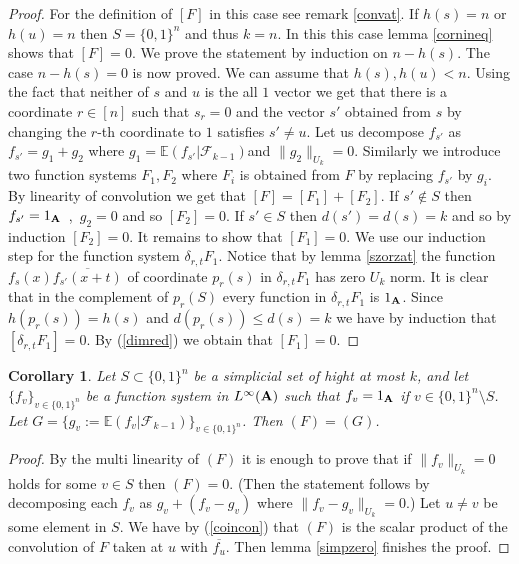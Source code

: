 \documentclass [11pt] {article}
\newtheorem{corollary}{Corollary}[section]
\def\bA{{\bf A}}
\begin{document}
\begin{proof}
For the definition of $[F]$ in this case see remark \ref{convat}. If $h(s)=n$ or $h(u)=n$ then $S=\{0,1\}^n$ and thus $k=n$. In this this case lemma \ref{cornineq} shows that $[F]=0$. We prove the statement by induction on $n-h(s)$. The case $n-h(s)=0$ is now proved. We can assume that $h(s),h(u)<n$. 
Using the fact that neither of $s$ and $u$ is the all $1$ vector we get that there is a coordinate $r\in [n]$ such that $s_r=0$ and the vector $s'$ obtained from $s$ by changing the $r$-th coordinate to $1$ satisfies $s'\neq u$. Let us decompose $f_{s'}$ as $f_{s'}=g_1+g_2$ where $g_1=\mathbb{E}(f_{s'}|\mathcal{F}_{k-1})$and $\|g_2\|_{U_k}=0$. Similarly we introduce two function systems $F_1,F_2$ where $F_i$ is obtained from $F$ by replacing $f_{s'}$ by $g_i$.
By linearity of convolution we get that $[F]=[F_1]+[F_2]$. If $s'\notin S$ then $f_{s'}=1_{\bA}$~,~$g_2=0$ and so $[F_2]=0$. If $s'\in S$ then $d(s')=d(s)=k$ and so by induction $[F_2]=0$. It remains to show that $[F_1]=0$.
We use our induction step for the function system $\delta_{r,t} F_1$. Notice that by lemma \ref{szorzat} the function $f_s(x)\overline{f_{s'}(x+t)}$ of coordinate $p_r(s)$ in $\delta_{r,t} F_1$ has zero $U_k$ norm. It is clear that in the complement of $p_r(S)$ every function in $\delta_{r,t} F_1$ is $1_{\bA}$. Since $h(p_r(s))=h(s)$ and $d(p_r(s))\leq d(s)=k$ we have by induction that $[\delta_{r,t} F_1]=0$. By (\ref{dimred}) we obtain that $[F_1]=0$.
\end{proof}

\begin{corollary}\label{simpzerocor} Let $S\subset\{0,1\}^n$ be a simplicial set of hight at most $k$, and let $\{f_v\}_{v\in\{0,1\}^n}$ be a function system in $L^\infty(\bA)$ such that $f_v=1_{\bA}$ if $v\in\{0,1\}^n\setminus S$. Let $G=\{g_v:=\mathbb{E}(f_v|\mathcal{F}_{k-1})\}_{v\in\{0,1\}^n}$. Then $(F)=(G)$. 
\end{corollary}

\begin{proof} By the multi linearity of $(F)$ it is enough to prove that if $\|f_v\|_{U_k}=0$ holds for some $v\in S$ then $(F)=0$. (Then the statement follows by decomposing each $f_v$ as $g_v+(f_v-g_v)$ where $\|f_v-g_v\|_{U_k}=0$.)
Let $u\neq v$ be some element in $S$. We have by (\ref{coincon}) that $(F)$ is the scalar product of the convolution of $F$ taken at $u$ with $\overline{f_u}$. Then lemma \ref{simpzero} finishes the proof. 
\end{proof}
\end{document}
